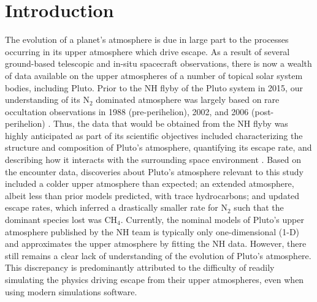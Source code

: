 \documentclass[times,12]{article}
\begin{document}
\section*{Introduction}
\noindent The evolution of a planet's atmosphere is due in large part to the processes occurring in its upper atmosphere which drive escape. As a result of several ground-based telescopic and in-situ spacecraft observations, there is now a wealth of data available on the upper atmospheres of a number of topical solar system bodies, including Pluto. Prior to the NH flyby of the Pluto system in 2015, our understanding of its N$_2$ dominated atmosphere was largely based on rare occultation observations in 1988 (pre-perihelion), 2002, and 2006 (post-perihelion) \citep{Elliot2007, Young2008}. Thus, the data that would be obtained from the NH flyby was highly anticipated as part of its scientific objectives included characterizing the structure and composition of Pluto's atmosphere, quantifying its escape rate, and describing how it interacts with the surrounding space environment \citep{Stern2015, Gladstone2016, Bagenal2016}. Based on the encounter data, discoveries about Pluto's atmosphere relevant to this study included a colder upper atmosphere than expected; an extended atmosphere, albeit less than prior models predicted, with trace hydrocarbons; and updated escape rates, which inferred a drastically smaller rate for N$_2$ such that the dominant species lost was CH$_4$. Currently, the nominal models of Pluto's upper atmosphere published by the NH team \citep{Young2018} is typically only one-dimensional (1-D) and approximates the upper atmosphere by fitting the NH data. However, there still remains a clear lack of understanding of the evolution of Pluto's atmosphere. This discrepancy is predominantly attributed to the difficulty of readily simulating the physics driving escape from their upper atmospheres, even when using modern simulations software.\\
\end{document}
